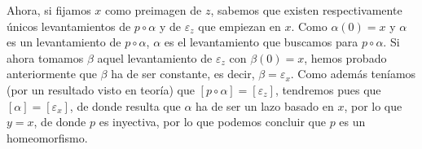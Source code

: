 \begin{ejercicio}
\begin{description}
   \end{description}
   Ahora, si fijamos $x$ como preimagen de $z$, sabemos que existen respectivamente únicos levantamientos de $p\circ \alpha$ y de $\varepsilon_z$ que empiezan en $x$. Como $\alpha(0) = x$ y $\alpha$ es un levantamiento de $p\circ \alpha$, $\alpha$ es el levantamiento que buscamos para $p\circ \alpha$. Si ahora tomamos $\beta$ aquel levantamiento de $\varepsilon_z$ con $\beta(0)=x$, hemos probado anteriormente que $\beta$ ha de ser constante, es decir, $\beta = \varepsilon_x$. Como además teníamos (por un resultado visto en teoría) que $[p\circ \alpha] = [\varepsilon_z]$, tendremos pues que $[\alpha] = [\varepsilon_x]$, de donde resulta que $\alpha$ ha de ser un lazo basado en $x$, por lo que $y=x$, de donde $p$ es inyectiva, por lo que podemos concluir que $p$ es un homeomorfismo.
\end{ejercicio}

